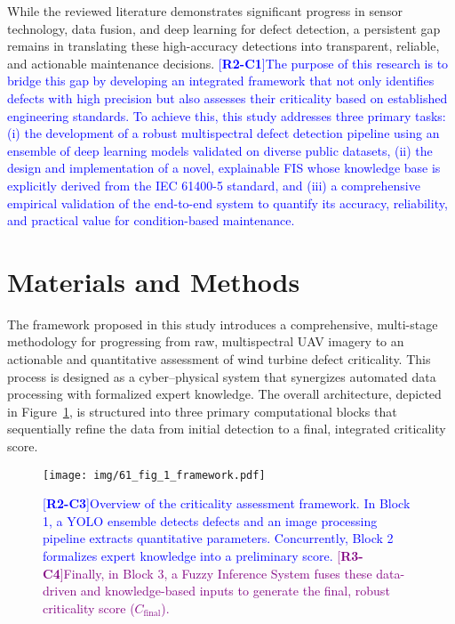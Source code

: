\documentclass[energies,article,submit,pdftex,moreauthors]{Definitions/mdpi}
\newcommand{\revtag}[2]{[\textbf{R#1-C#2}]}
\newcommand{\Rtwo}[1]{\textcolor{blue}{#1}}
\newcommand{\Rthree}[1]{\textcolor{purple}{#1}}
\begin{document}
While the reviewed literature demonstrates significant progress in sensor technology, data fusion, and deep learning for defect detection, a persistent gap remains in translating these high-accuracy detections into transparent, reliable, and actionable maintenance decisions. \Rtwo{\revtag{2}{1}The purpose of this research is to bridge this gap by developing an integrated framework that not only identifies defects with high precision but also assesses their criticality based on established engineering standards. To achieve this, this study addresses three primary tasks: (i) the development of a robust multispectral defect detection pipeline using an ensemble of deep learning models validated on diverse public datasets, (ii) the design and implementation of a novel, explainable FIS whose knowledge base is explicitly derived from the IEC 61400-5 standard, and (iii) a comprehensive empirical validation of the end-to-end system to quantify its accuracy, reliability, and practical value for condition-based maintenance.}


\section{Materials and Methods}\label{sec:methods}

The framework proposed in this study introduces a comprehensive, multi-stage methodology for progressing from raw, multispectral UAV imagery to an actionable and quantitative assessment of wind turbine defect criticality. This process is designed as a cyber--physical system that synergizes automated data processing with formalized expert knowledge. The overall architecture, depicted in Figure~\ref{fig:method_overview}, is structured into three primary computational blocks that sequentially refine the data from initial detection to a final, integrated criticality score.

\begin{figure}[!htb]
    \centering
    \texttt{[image: img/61\_fig\_1\_framework.pdf]} 
    \caption{\Rtwo{\revtag{2}{3}Overview of the criticality assessment framework. In Block 1, a YOLO ensemble detects defects and an image processing pipeline extracts quantitative parameters. Concurrently, Block 2 formalizes expert knowledge into a preliminary score. \Rthree{\revtag{3}{4}Finally, in Block 3, a Fuzzy Inference System fuses these data-driven and knowledge-based inputs to generate the final, robust criticality score (\(C_{\text{final}}\)).}}}
    \label{fig:method_overview}
\end{figure}
\end{document}
